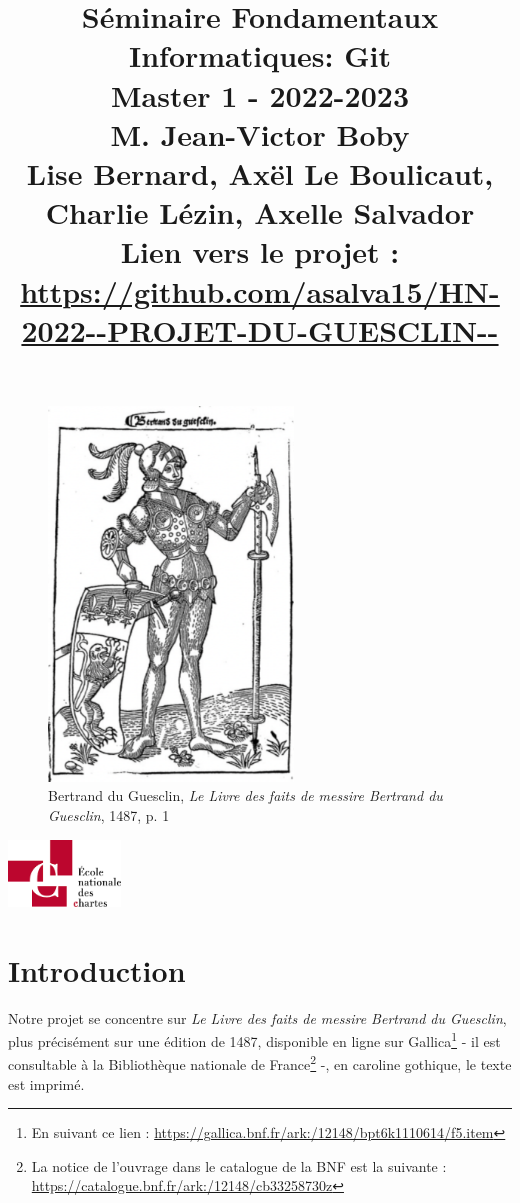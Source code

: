 \documentclass{article}
\date{}
\title{Séminaire \og Fondamentaux Informatiques: Git\fg \\ Master 1 - 2022-2023\\ \large
M. Jean-Victor Boby \\ \small Lise Bernard, Axël Le Boulicaut, Charlie Lézin, Axelle Salvador \\ Lien vers le projet : \url{https://github.com/asalva15/HN-2022--PROJET-DU-GUESCLIN--}}
\begin{document}
\maketitle
\begin{figure}[ht]
  \centering
  \includegraphics[width=6.5cm]{Bertrand.png}
  \caption{\small Bertrand du Guesclin, \textit{Le Livre des faits de messire Bertrand du Guesclin}, 1487, p. 1}
\end{figure}

\includegraphics[width=3cm]{Unknown.png}



\section{Introduction}

Notre projet se concentre sur \textit{Le Livre des faits de messire Bertrand du Guesclin}, plus précisément sur une édition de 1487, disponible en ligne sur Gallica\footnote{En suivant ce lien : \url{https://gallica.bnf.fr/ark:/12148/bpt6k1110614/f5.item}} - il est consultable à la Bibliothèque nationale de France\footnote{La notice de l'ouvrage dans le catalogue de la BNF est la suivante : \url{https://catalogue.bnf.fr/ark:/12148/cb33258730z}} -, en caroline gothique, le texte est imprimé.\\
\end{document}
